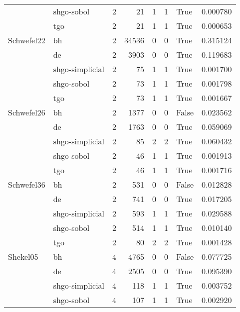 \begin{longtable}{llrrrrlr}
         & shgo-sobol &     2 &       21 &      1 &       1 &    True &    0.000780 \\
         & tgo &     2 &       21 &      1 &       1 &    True &    0.000653 \\
Schwefel22 & bh &     2 &    34536 &      0 &       0 &    True &    0.315124 \\
         & de &     2 &     3903 &      0 &       0 &    True &    0.119683 \\
         & shgo-simplicial &     2 &       75 &      1 &       1 &    True &    0.001700 \\
         & shgo-sobol &     2 &       73 &      1 &       1 &    True &    0.001798 \\
         & tgo &     2 &       73 &      1 &       1 &    True &    0.001667 \\
Schwefel26 & bh &     2 &     1377 &      0 &       0 &   False &    0.023562 \\
         & de &     2 &     1763 &      0 &       0 &    True &    0.059069 \\
         & shgo-simplicial &     2 &       85 &      2 &       2 &    True &    0.060432 \\
         & shgo-sobol &     2 &       46 &      1 &       1 &    True &    0.001913 \\
         & tgo &     2 &       46 &      1 &       1 &    True &    0.001716 \\
Schwefel36 & bh &     2 &      531 &      0 &       0 &   False &    0.012828 \\
         & de &     2 &      741 &      0 &       0 &    True &    0.017205 \\
         & shgo-simplicial &     2 &      593 &      1 &       1 &    True &    0.029588 \\
         & shgo-sobol &     2 &      514 &      1 &       1 &    True &    0.010140 \\
         & tgo &     2 &       80 &      2 &       2 &    True &    0.001428 \\
Shekel05 & bh &     4 &     4765 &      0 &       0 &   False &    0.077725 \\
         & de &     4 &     2505 &      0 &       0 &    True &    0.095390 \\
         & shgo-simplicial &     4 &      118 &      1 &       1 &    True &    0.003752 \\
         & shgo-sobol &     4 &      107 &      1 &       1 &    True &    0.002920 \\

\end{longtable}
